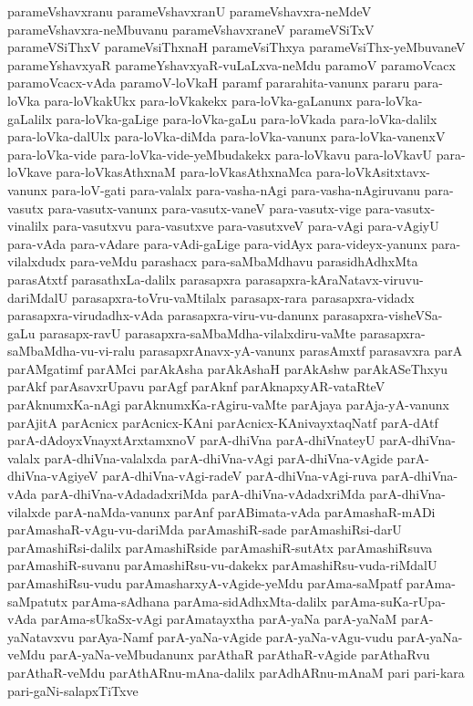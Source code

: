{parameVshavxranu
parameVshavxranU
parameVshavxra-neMdeV
parameVshavxra-neMbuvanu
parameVshavxraneV
parameVSiTxV
parameVSiThxV
parameVsiThxnaH
parameVsiThxya
parameVsiThx-yeMbuvaneV
parameYshavxyaR
parameYshavxyaR-vuLaLxva-neMdu
paramoV
paramoVcacx
paramoVcacx-vAda
paramoV-loVkaH
paramf
pararahita-vanunx
pararu
para-loVka
para-loVkakUkx
para-loVkakekx
para-loVka-gaLanunx
para-loVka-gaLalilx
para-loVka-gaLige
para-loVka-gaLu
para-loVkada
para-loVka-dalilx
para-loVka-dalUlx
para-loVka-diMda
para-loVka-vanunx
para-loVka-vanenxV
para-loVka-vide
para-loVka-vide-yeMbudakekx
para-loVkavu
para-loVkavU
para-loVkave
para-loVkasAthxnaM
para-loVkasAthxnaMca
para-loVkAsitxtavx-vanunx
para-loV-gati
para-valalx
para-vasha-nAgi
para-vasha-nAgiruvanu
para-vasutx
para-vasutx-vanunx
para-vasutx-vaneV
para-vasutx-vige
para-vasutx-vinalilx
para-vasutxvu
para-vasutxve
para-vasutxveV
para-vAgi
para-vAgiyU
para-vAda
para-vAdare
para-vAdi-gaLige
para-vidAyx
para-videyx-yanunx
para-vilalxdudx
para-veMdu
parashacx
para-saMbaMdhavu
parasidhAdhxMta
parasAtxtf
parasathxLa-dalilx
parasapxra
parasapxra-kAraNatavx-viruvu-dariMdalU
parasapxra-toVru-vaMtilalx
parasapx-rara
parasapxra-vidadx
parasapxra-virudadhx-vAda
parasapxra-viru-vu-danunx
parasapxra-visheVSa-gaLu
parasapx-ravU
parasapxra-saMbaMdha-vilalxdiru-vaMte
parasapxra-saMbaMdha-vu-vi-ralu
parasapxrAnavx-yA-vanunx
parasAmxtf
parasavxra
parA
parAMgatimf
parAMci
parAkAsha
parAkAshaH
parAkAshw
parAkASeThxyu
parAkf
parAsavxrUpavu
parAgf
parAknf
parAknapxyAR-vataRteV
parAknumxKa-nAgi
parAknumxKa-rAgiru-vaMte
parAjaya
parAja-yA-vanunx
parAjitA
parAcnicx
parAcnicx-KAni
parAcnicx-KAnivayxtaqNatf
parA-dAtf
parA-dAdoyxVnayxtArxtamxnoV
parA-dhiVna
parA-dhiVnateyU
parA-dhiVna-valalx
parA-dhiVna-valalxda
parA-dhiVna-vAgi
parA-dhiVna-vAgide
parA-dhiVna-vAgiyeV
parA-dhiVna-vAgi-radeV
parA-dhiVna-vAgi-ruva
parA-dhiVna-vAda
parA-dhiVna-vAdadadxriMda
parA-dhiVna-vAdadxriMda
parA-dhiVna-vilalxde
parA-naMda-vanunx
parAnf
parABimata-vAda
parAmashaR-mADi
parAmashaR-vAgu-vu-dariMda
parAmashiR-sade
parAmashiRsi-darU
parAmashiRsi-dalilx
parAmashiRside
parAmashiR-sutAtx
parAmashiRsuva
parAmashiR-suvanu
parAmashiRsu-vu-dakekx
parAmashiRsu-vuda-riMdalU
parAmashiRsu-vudu
parAmasharxyA-vAgide-yeMdu
parAma-saMpatf
parAma-saMpatutx
parAma-sAdhana
parAma-sidAdhxMta-dalilx
parAma-suKa-rUpa-vAda
parAma-sUkaSx-vAgi
parAmatayxtha
parA-yaNa
parA-yaNaM
parA-yaNatavxvu
parAya-Namf
parA-yaNa-vAgide
parA-yaNa-vAgu-vudu
parA-yaNa-veMdu
parA-yaNa-veMbudanunx
parAthaR
parAthaR-vAgide
parAthaRvu
parAthaR-veMdu
parAthARnu-mAna-dalilx
parAdhARnu-mAnaM
pari
pari-kara
pari-gaNi-salapxTiTxve
}
